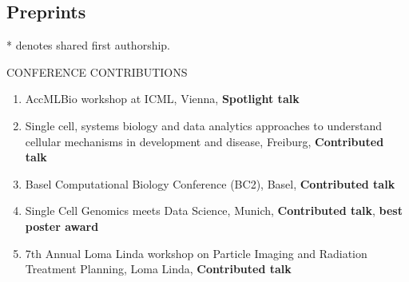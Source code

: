 \documentclass{resume} %
\begin{document}
\subsection*{Preprints}
\printbibliography[keyword={preprint},heading={none}]
* denotes shared first authorship.


\begin{rSection}{CONFERENCE CONTRIBUTIONS}
 
\begin{enumerate}
\item[2024] AccMLBio workshop at ICML, Vienna, \textbf{Spotlight talk}
\item[2023] Single cell, systems biology and data analytics approaches to understand cellular mechanisms in development and disease, Freiburg, \textbf{Contributed talk}
\item[2023] Basel Computational Biology Conference (BC2), Basel, \textbf{Contributed talk}
\item[2022] Single Cell Genomics meets Data Science, Munich, \textbf{Contributed talk}, \textbf{best poster award}
\item[2021] 7th Annual Loma Linda workshop on Particle Imaging and Radiation Treatment Planning, Loma Linda, \textbf{Contributed talk}
\end{enumerate}
\end{rSection}
\end{document}
